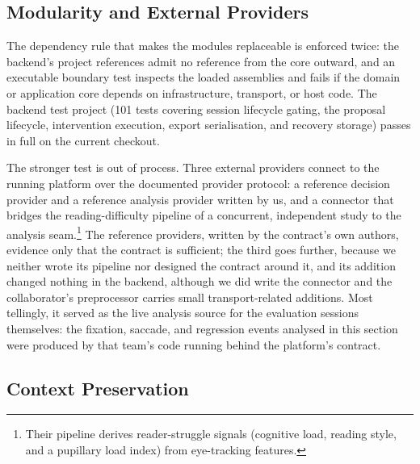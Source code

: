 \begin{widetable}
\centering
\small
\caption{Observed timing quantities in milliseconds.
$n$ counts recorded pings, evaluations, or matched exchanges, not participants; the advisory run is a separate recording; percentiles are linearly interpolated.
Gaze freshness ends at decision dispatch; none of these rows measures complete gaze-to-display latency.}
\label{tab:timing}

\end{widetable}

\subsection{Modularity and External Providers}
\label{sec:eval-modularity}

The dependency rule that makes the modules replaceable is enforced twice: the backend's project references admit no reference from the core outward, and an executable boundary test inspects the loaded assemblies and fails if the domain or application core depends on infrastructure, transport, or host code.
The backend test project (101 tests covering session lifecycle gating, the proposal lifecycle, intervention execution, export serialisation, and recovery storage) passes in full on the current checkout.

The stronger test is out of process.
Three external providers connect to the running platform over the documented provider protocol: a reference decision provider and a reference analysis provider written by us, and a connector that bridges the reading-difficulty pipeline of a concurrent, independent study \cite{kraljevic2026struggle} to the analysis seam.\footnote{Their pipeline derives reader-struggle signals (cognitive load, reading style, and a pupillary load index) from eye-tracking features.}
The reference providers, written by the contract's own authors, evidence only that the contract is sufficient; the third goes further, because we neither wrote its pipeline nor designed the contract around it, and its addition changed nothing in the backend, although we did write the connector and the collaborator's preprocessor carries small transport-related additions.
Most tellingly, it served as the live analysis source for the \sessionsN{} evaluation sessions themselves: the fixation, saccade, and regression events analysed in this section were produced by that team's code running behind the platform's contract.

\subsection{Context Preservation}
\label{sec:eval-context}

